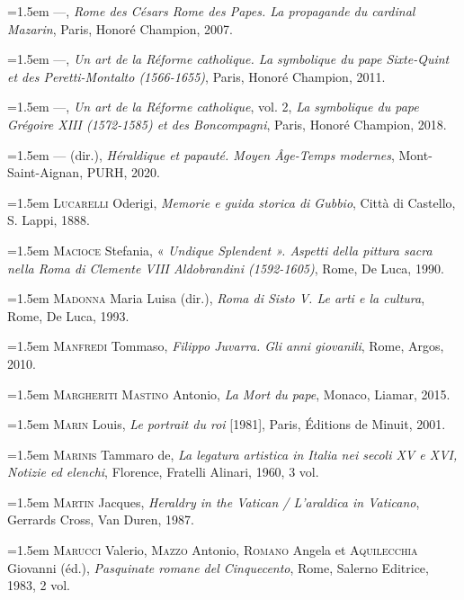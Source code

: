 \documentclass[12pt,twoside,openany]{book}
\newenvironment{PurhBibliography}
  {%
    \par
    \setlength{\parindent}{0pt}%
    \setlength{\leftskip}{0pt}%
  }
  {%
    \par
  }
\begin{document}
\begin{PurhBibliography}
\noindent\hangindent=1.5em —, \textit{Rome des Césars Rome des Papes. La propagande du cardinal Mazarin}, Paris, Honoré Champion, 2007.\par
\noindent\hangindent=1.5em —, \textit{Un art de la Réforme catholique. La symbolique du pape Sixte-Quint et des Peretti-Montalto (1566-1655)}, Paris, Honoré Champion, 2011.\par
\noindent\hangindent=1.5em —, \textit{Un art de la Réforme catholique}, vol. 2,\textit{ La symbolique du pape Grégoire XIII (1572-1585) et des Boncompagni}, Paris, Honoré Champion, 2018.\par
\noindent\hangindent=1.5em \textsc{—} (dir.), \textit{Héraldique et papauté. Moyen Âge-Temps modernes}, Mont-Saint-Aignan, PURH, 2020.\par
\noindent\hangindent=1.5em \textsc{Lucarelli} Oderigi, \textit{Memorie e guida storica di Gubbio}, Città di Castello, S. Lappi, 1888.\par
\noindent\hangindent=1.5em \textsc{Macioce} Stefania, « \textit{Undique Splendent ». Aspetti della pittura sacra nella Roma di Clemente VIII Aldobrandini (1592-1605)}, Rome, De Luca, 1990.\par
\noindent\hangindent=1.5em \textsc{Madonna} Maria Luisa (dir.), \textit{Roma di Sisto V. Le arti e la cultura}, Rome, De Luca, 1993.\par
\noindent\hangindent=1.5em \textsc{Manfredi} Tommaso, \textit{Filippo Juvarra. Gli anni giovanili}, Rome, Argos, 2010.\par
\noindent\hangindent=1.5em \textsc{Margheriti Mastino} Antonio,\textit{ La Mort du pape}, Monaco, Liamar, 2015.\par
\noindent\hangindent=1.5em \textsc{Marin} Louis, \textit{Le portrait du roi} [1981], Paris, Éditions de Minuit, 2001.\par
\noindent\hangindent=1.5em \textsc{Marinis} Tammaro de, \textit{La legatura artistica in Italia nei secoli XV e XVI, Notizie ed elenchi}, Florence, Fratelli Alinari, 1960, 3 vol.\par
\noindent\hangindent=1.5em \textsc{Martin} Jacques, \textit{Heraldry in the Vatican / L’araldica in Vaticano}, Gerrards Cross, Van Duren, 1987.\par
\noindent\hangindent=1.5em \textsc{Marucci} Valerio, \textsc{Mazzo} Antonio, \textsc{Romano} Angela et \textsc{Aquilecchia} Giovanni (éd.), \textit{Pasquinate romane del Cinquecento}, Rome, Salerno Editrice, 1983, 2 vol.\par

\end{PurhBibliography}
\end{document}
